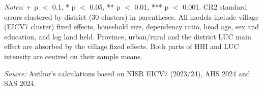 \begin{table}[htbp]
\vspace{0.5em}
\begin{minipage}{\linewidth}
\footnotesize
\textit{Notes:} + p $<$ 0.1, * p $<$ 0.05, ** p $<$ 0.01, *** p $<$ 0.001. CR2 standard errors clustered by district (30 clusters) in parentheses. All models include village (EICV7 cluster) fixed effects, household size, dependency ratio, head age, sex and education, and log land held. Province, urban/rural and the district LUC main effect are absorbed by the village fixed effects. Both parts of HHI and LUC intensity are centred on their sample means.

\textit{Source:} Author's calculations based on NISR EICV7 (2023/24), AHS 2024 and SAS 2024.
\end{minipage}
\end{table}
